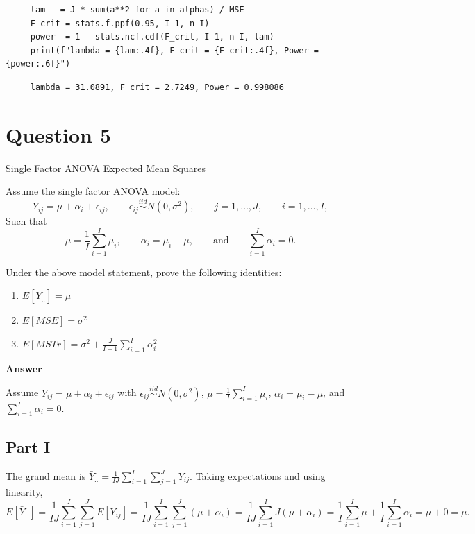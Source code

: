 \documentclass[letterpaper]{article}
\begin{document}
	\begin{lstlisting}
     lam   = J * sum(a**2 for a in alphas) / MSE
     F_crit = stats.f.ppf(0.95, I-1, n-I)
     power  = 1 - stats.ncf.cdf(F_crit, I-1, n-I, lam)
     print(f"lambda = {lam:.4f}, F_crit = {F_crit:.4f}, Power = {power:.6f}")
	\end{lstlisting}
 \begin{minipage}{\linewidth}
	\begin{Verbatim}
     lambda = 31.0891, F_crit = 2.7249, Power = 0.998086
	\end{Verbatim}
\end{minipage}
		\clearpage
		
		\section{Question 5}
		
		{\color{deepred}   Single Factor ANOVA Expected Mean Squares}
		
		Assume the single factor ANOVA model:
		\[
		Y_{ij}=\mu+\alpha_i+\epsilon_{ij},
		\qquad
		\epsilon_{ij}\overset{iid}{\sim}N(0,\sigma^2),
		\qquad
		j=1,\ldots,J,
		\qquad
		i=1,\ldots,I,
		\]
		Such that
		\begin{equation}
			\mu=\frac{1}{I}\sum_{i=1}^I \mu_i,
			\qquad
			\alpha_i=\mu_i-\mu,
			\qquad \text{and} \qquad
			\sum_{i=1}^I \alpha_i=0.
		\end{equation}
		
		Under the above model statement, prove the following identities:
		\begin{enumerate}
			\item[(i)]
			$
			E[\bar{Y}_{..}]=\mu
			$
			
			\item[(ii)]
			$
			E[MSE]=\sigma^2
			$
			
			\item[(iii)]
			$
			E[MSTr]=\sigma^2+\frac{J}{I-1}\sum_{i=1}^I \alpha_i^2
			$
		\end{enumerate}
		
		\textbf{Answer}
		
		Assume $Y_{ij} = \mu + \alpha_i + \epsilon_{ij}$ with $\epsilon_{ij} \overset{iid}{\sim} N(0,\sigma^2)$,
		$\mu = \frac{1}{I}\sum_{i=1}^I \mu_i$, $\alpha_i = \mu_i - \mu$, and $\sum_{i=1}^I \alpha_i = 0$.
		
		\subsection{Part I}
			The grand mean is $\bar{Y}_{..} = \frac{1}{IJ}\sum_{i=1}^I\sum_{j=1}^J Y_{ij}$.
			Taking expectations and using linearity,
			\[
			E[\bar{Y}_{..}]
			= \frac{1}{IJ}\sum_{i=1}^I\sum_{j=1}^J E[Y_{ij}]
			= \frac{1}{IJ}\sum_{i=1}^I\sum_{j=1}^J (\mu + \alpha_i)
			= \frac{1}{IJ}\sum_{i=1}^I J(\mu + \alpha_i)
			= \frac{1}{I}\sum_{i=1}^I \mu + \frac{1}{I}\sum_{i=1}^I \alpha_i
			= \mu + 0 = \mu. 
			\]
			
\end{document}
